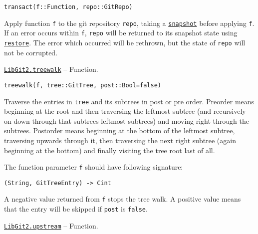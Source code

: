 \begin{adjustwidth}{2em}{0pt}


\begin{verbatim}
transact(f::Function, repo::GitRepo)
\end{verbatim}

Apply function \texttt{f} to the git repository \texttt{repo}, taking a \hyperlink{5664620894068288269}{\texttt{snapshot}} before applying \texttt{f}. If an error occurs within \texttt{f}, \texttt{repo} will be returned to its snapshot state using \hyperlink{1068934750891016732}{\texttt{restore}}. The error which occurred will be rethrown, but the state of \texttt{repo} will not be corrupted.



\end{adjustwidth}
\hypertarget{11991883748960508451}{} 
\hyperlink{11991883748960508451}{\texttt{LibGit2.treewalk}}  -- {Function.}

\begin{adjustwidth}{2em}{0pt}


\begin{verbatim}
treewalk(f, tree::GitTree, post::Bool=false)
\end{verbatim}

Traverse the entries in \texttt{tree} and its subtrees in post or pre order. Preorder means beginning at the root and then traversing the leftmost subtree (and recursively on down through that subtree{\textquotesingle}s leftmost subtrees) and moving right through the subtrees. Postorder means beginning at the bottom of the leftmost subtree, traversing upwards through it, then traversing the next right subtree (again beginning at the bottom) and finally visiting the tree root last of all.

The function parameter \texttt{f} should have following signature:


\begin{lstlisting}
(String, GitTreeEntry) -> Cint
\end{lstlisting}

A negative value returned from \texttt{f} stops the tree walk. A positive value means that the entry will be skipped if \texttt{post} is \texttt{false}.



\end{adjustwidth}
\hypertarget{14916286790794253178}{} 
\hyperlink{14916286790794253178}{\texttt{LibGit2.upstream}}  -- {Function.}

